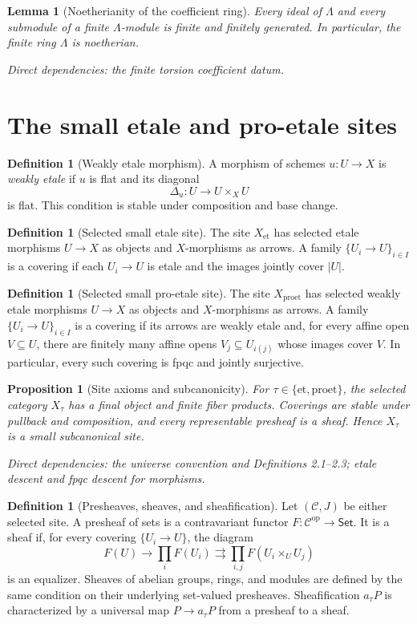 \documentclass[10pt]{article}
\newtheorem{proposition}[theorem]{Proposition}
\newtheorem{lemma}[theorem]{Lemma}
\theoremstyle{definition}
\newtheorem{definition}[theorem]{Definition}
\newcommand{\Lam}{\Lambda}
\newcommand{\et}{\mathrm{et}}
\newcommand{\proet}{\mathrm{proet}}
\newcommand{\dep}[1]{\par\smallskip\noindent\textit{Direct dependencies: #1}}
\begin{document}
\begin{lemma}[Noetherianity of the coefficient ring]
Every ideal of $\Lam$ and every submodule of a finite $\Lam$-module is finite
and finitely generated.  In particular, the finite ring $\Lam$ is noetherian.
\dep{the finite torsion coefficient datum.}
\end{lemma}

\section{The small etale and pro-etale sites}

\begin{definition}[Weakly etale morphism]
A morphism of schemes $u:U\to X$ is \emph{weakly etale} if $u$ is flat and its
diagonal
\[
\Delta_u:U\longrightarrow U\times_XU
\]
is flat.  This condition is stable under composition and base change.
\end{definition}

\begin{definition}[Selected small etale site]
The site $X_{\et}$ has selected etale morphisms $U\to X$ as objects and
$X$-morphisms as arrows.  A family $\{U_i\to U\}_{i\in I}$ is a covering if
each $U_i\to U$ is etale and the images jointly cover $|U|$.
\end{definition}

\begin{definition}[Selected small pro-etale site]
The site $X_{\proet}$ has selected weakly etale morphisms $U\to X$ as objects
and $X$-morphisms as arrows.  A family $\{U_i\to U\}_{i\in I}$ is a covering
if its arrows are weakly etale and, for every affine open $V\subseteq U$, there
are finitely many affine opens $V_j\subseteq U_{i(j)}$ whose images cover $V$.
In particular, every such covering is fpqc and jointly surjective.
\end{definition}

\begin{proposition}[Site axioms and subcanonicity]
For $\tau\in\{\et,\proet\}$, the selected category $X_\tau$ has a final object
and finite fiber products.  Coverings are stable under pullback and composition,
and every representable presheaf is a sheaf.  Hence $X_\tau$ is a small
subcanonical site.
\dep{the universe convention and Definitions 2.1--2.3; etale descent and fpqc
descent for morphisms.}
\end{proposition}

\begin{definition}[Presheaves, sheaves, and sheafification]
Let $(\mathcal C,J)$ be either selected site.  A presheaf of sets is a
contravariant functor $F:\mathcal C^{\mathrm{op}}\to\mathsf{Set}$.  It is a
sheaf if, for every covering $\{U_i\to U\}$, the diagram
\[
F(U)\longrightarrow\prod_iF(U_i)
\rightrightarrows\prod_{i,j}F(U_i\times_UU_j)
\]
is an equalizer.  Sheaves of abelian groups, rings, and modules are defined by
the same condition on their underlying set-valued presheaves.  Sheafification
$a_\tau P$ is characterized by a universal map $P\to a_\tau P$ from a
presheaf to a sheaf.
\end{definition}
\end{document}
